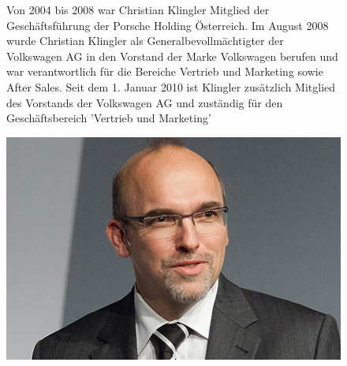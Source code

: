 \documentclass[12pt]{article}
\begin{document}
\begin{figure}[here!]
	\centering
	\begin{minipage}[h]{0.65\textwidth}
		Von 2004 bis 2008 war Christian Klingler Mitglied der Geschäftsführung der Porsche Holding Österreich.
		Im August 2008 wurde Christian Klingler als Generalbevollmächtigter der Volkswagen AG in den Vorstand der Marke Volkswagen berufen und war verantwortlich für die Bereiche Vertrieb und Marketing sowie After Sales. Seit dem 1. Januar 2010 ist Klingler zusätzlich Mitglied des Vorstands der Volkswagen AG und zuständig für den Geschäftsbereich 'Vertrieb und Marketing'
	\end{minipage}
	\begin{minipage}[h]{0.10\textwidth}
		\hspace{1cm} 
	\end{minipage}
	\begin{minipage}[h]{0.20\textwidth}
		\centering
		\includegraphics[width=1.0\textwidth]{images/ChristianKlingler.jpg}
		\label{fig:vorstandvw3}
		\cite{ckpic}
	\end{minipage}
\end{figure}
\end{document}
